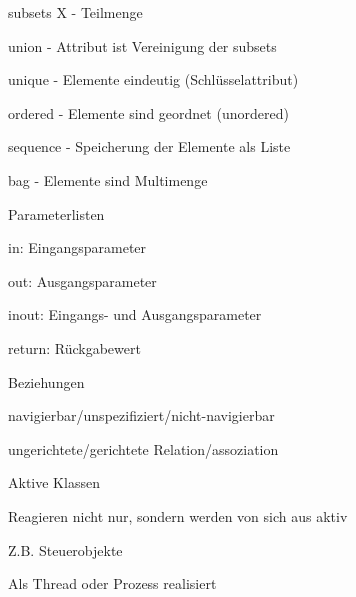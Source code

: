 \documentclass[a4paper]{article}
\begin{document}
\begin{multicols}{3}
\begin{itemize*}
\begin{itemize*}
      \item subsets X - Teilmenge
      \item union - Attribut ist Vereinigung der subsets
      \item unique - Elemente eindeutig (Schlüsselattribut)
      \item ordered - Elemente sind geordnet (unordered)
      \item sequence - Speicherung der Elemente als Liste
      \item bag - Elemente sind Multimenge
    \end{itemize*}
    \item Parameterlisten
    \begin{itemize*}
      \item in: Eingangsparameter
      \item out: Ausgangsparameter
      \item inout: Eingangs- und Ausgangsparameter
      \item return: Rückgabewert
    \end{itemize*}
    \item Beziehungen
    \begin{itemize*}
      \item navigierbar/unspezifiziert/nicht-navigierbar
      \item ungerichtete/gerichtete Relation/assoziation
    \end{itemize*}
  \end{itemize*}

  Aktive Klassen
  \begin{itemize*}
    \item Reagieren nicht nur, sondern werden von sich aus aktiv
    \item Z.B. Steuerobjekte
    \item Als Thread oder Prozess realisiert
  \end{itemize*}


\end{multicols}
\end{document}
